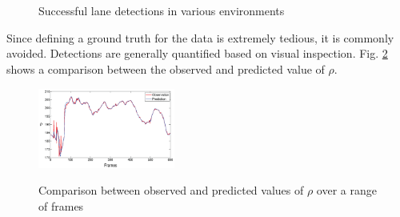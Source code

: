 \documentclass{article}
\begin{document}
\begin{figure}[htb!]
  \centering
  \hspace{0.00001in}
  \\
  \hspace{0.00001in}
  \\
  \caption{Successful lane detections in various environments}
  \label{fig:lane_detection}
\end{figure}
Since defining a ground truth for the data is extremely tedious, it is commonly avoided.
Detections are generally quantified based on visual inspection. Fig. \ref{fig:obs_pred_kalman} shows a comparison between the observed and predicted value of $\rho$.
\begin{figure}[htb!]
  \centering
  \includegraphics[width=0.4\textwidth]{IMG/obs_pred_rho_crop.png}\\
  \caption{Comparison between observed and predicted values of $\rho$ over a range of frames}
  \label{fig:obs_pred_kalman}
\end{figure}
\end{document}
